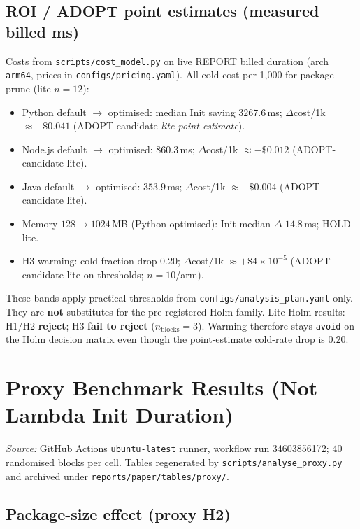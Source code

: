 \subsection{ROI / ADOPT point estimates (measured billed ms)}

Costs from \texttt{scripts/cost\_model.py} on live REPORT billed duration (arch
\texttt{arm64}, prices in \texttt{configs/pricing.yaml}). All-cold cost per 1{,}000 for
package prune (lite $n{=}12$):

\begin{itemize}
    \item Python default $\rightarrow$ optimised: median Init saving $3267.6$\,ms;
      $\Delta$cost/1k $\approx -\$0.041$ (ADOPT-candidate \emph{lite point estimate}).
    \item Node.js default $\rightarrow$ optimised: $860.3$\,ms; $\Delta$cost/1k
      $\approx -\$0.012$ (ADOPT-candidate lite).
    \item Java default $\rightarrow$ optimised: $353.9$\,ms; $\Delta$cost/1k
      $\approx -\$0.004$ (ADOPT-candidate lite).
    \item Memory $128{\rightarrow}1024$\,MB (Python optimised): Init median $\Delta$
      $14.8$\,ms; HOLD-lite.
    \item H3 warming: cold-fraction drop $0.20$; $\Delta$cost/1k $\approx +\$4{\times}10^{-5}$
      (ADOPT-candidate lite on thresholds; $n{=}10$/arm).
\end{itemize}

These bands apply practical thresholds from \texttt{configs/analysis\_plan.yaml} only.
They are \textbf{not} substitutes for the pre-registered Holm family.
Lite Holm results: H1/H2 \textbf{reject}; H3 \textbf{fail to reject} ($n_{\mathrm{blocks}}=3$).
Warming therefore stays \texttt{avoid} on the Holm decision matrix even though the
point-estimate cold-rate drop is $0.20$.

\section{Proxy Benchmark Results (Not Lambda Init Duration)}
\label{sec:eval_proxy}

\textit{Source:} GitHub Actions \texttt{ubuntu-latest} runner, workflow run 34603856172;
40 randomised blocks per cell. Tables regenerated by \texttt{scripts/analyse\_proxy.py}
and archived under \texttt{reports/paper/tables/proxy/}.

\subsection{Package-size effect (proxy H2)}

